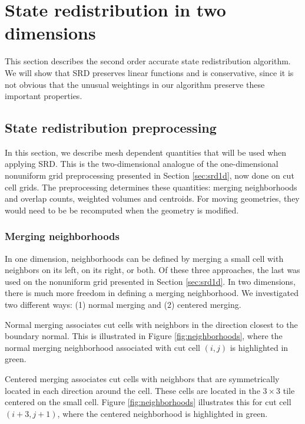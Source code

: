 \section{State redistribution in two dimensions}\label{sec:srdAlg}

This section describes the second order accurate
state redistribution algorithm. 
We will show that SRD preserves linear functions and is conservative, since
it is not obvious that the unusual weightings in our algorithm
preserve these important properties.

\subsection{State redistribution preprocessing}\label{sec:preprocessing}


In this section, we describe mesh dependent quantities that will be used when applying 
SRD. This is the two-dimensional analogue of the one-dimensional 
nonuniform grid preprocessing presented in Section \ref{sec:srd1d}, now done on cut cell grids.
The preprocessing determines these quantities: merging neighborhoods and overlap counts, 
weighted volumes and centroids.
For moving geometries, they would need to be be recomputed
when the geometry is modified.

\subsubsection*{Merging neighborhoods}

In one dimension, neighborhoods can be defined by merging a small cell with neighbors on its left, on its right, or both.  Of these three approaches, the last was used on the nonuniform grid presented in Section \ref{sec:srd1d}.
In two dimensions, there is much more freedom in defining a merging neighborhood.  
We investigated two different ways: (1) normal merging and (2) centered merging.

Normal merging associates cut cells with neighbors in the direction closest to the 
boundary normal.  This is illustrated in Figure \ref{fig:neighborhoods},
where the normal merging neighborhood associated with cut cell $(i,j)$ is highlighted in green.

Centered merging associates cut cells with neighbors that are 
symmetrically located in each direction around the cell.
These cells are located in the $3 \times 3$ tile centered on the small cell.  Figure \ref{fig:neighborhoods}
illustrates this for cut cell $(i+3,j+1)$, where the centered neighborhood is highlighted in green.

